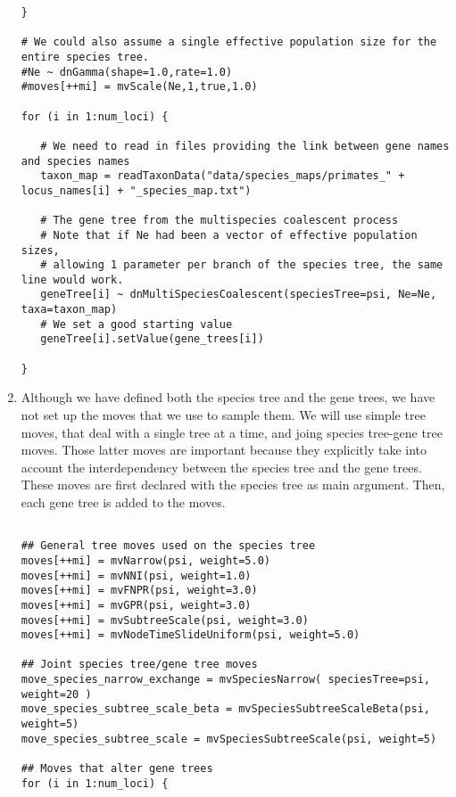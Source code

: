 \begin{enumerate}
{\begin{snugshade*}
\begin{lstlisting}
}

# We could also assume a single effective population size for the entire species tree.
#Ne ~ dnGamma(shape=1.0,rate=1.0)
#moves[++mi] = mvScale(Ne,1,true,1.0)

for (i in 1:num_loci) {

   # We need to read in files providing the link between gene names and species names
   taxon_map = readTaxonData("data/species_maps/primates_" + locus_names[i] + "_species_map.txt")

   # The gene tree from the multispecies coalescent process
   # Note that if Ne had been a vector of effective population sizes,
   # allowing 1 parameter per branch of the species tree, the same line would work.
   geneTree[i] ~ dnMultiSpeciesCoalescent(speciesTree=psi, Ne=Ne, taxa=taxon_map)
   # We set a good starting value
   geneTree[i].setValue(gene_trees[i])

}

\end{lstlisting}
\end{snugshade*}}

\item Although we have defined both the species tree and the gene trees, we have not set up the moves that we use to sample them.
We will use simple tree moves, that deal with a single tree at a time, and joing species tree-gene tree moves.
Those latter moves are important because they explicitly take into account the interdependency between the species tree and the gene trees.
These moves are first declared with the species tree as main argument. 
Then, each gene tree is added to the moves.


{\tt \begin{snugshade*}
\begin{lstlisting}

## General tree moves used on the species tree
moves[++mi] = mvNarrow(psi, weight=5.0)
moves[++mi] = mvNNI(psi, weight=1.0)
moves[++mi] = mvFNPR(psi, weight=3.0)
moves[++mi] = mvGPR(psi, weight=3.0)
moves[++mi] = mvSubtreeScale(psi, weight=3.0)
moves[++mi] = mvNodeTimeSlideUniform(psi, weight=5.0)

## Joint species tree/gene tree moves
move_species_narrow_exchange = mvSpeciesNarrow( speciesTree=psi, weight=20 )
move_species_subtree_scale_beta = mvSpeciesSubtreeScaleBeta(psi, weight=5)
move_species_subtree_scale = mvSpeciesSubtreeScale(psi, weight=5)

## Moves that alter gene trees
for (i in 1:num_loci) {


\end{lstlisting}
\end{snugshade*}}
\end{enumerate}
